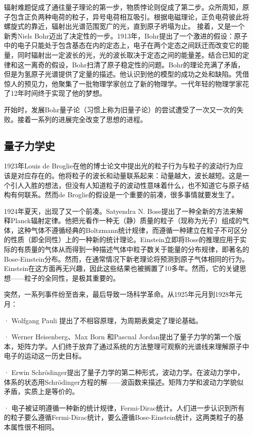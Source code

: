 \documentclass[13pt,a4paper]{article}
\begin{document}
\begin{CJK}{UTF8}{song}
辐射难题促成了通往量子理论的第一步，物质悖论则促成了第二步。众所周知，原子包含正负两种电荷的粒子，异号电荷相互吸引。根据电磁理论，正负电荷彼此将螺旋式的靠近，辐射出光谱范围宽广的光，直到原子坍塌为止。
接着，又是一个新秀Niels Bohr迈出了决定性的一步。1913年，Bohr提出了一个激进的假设：原子中的电子只能处于包含基态在内的定态上，电子在两个定态之间跃迁而改变它的能量，同时辐射出一定波长的光，光的波长取决于定态之间的能量差。结合已知的定律和这一离奇的假设，Bohr扫清了原子稳定性的问题。Bohr的理论充满了矛盾，但是为氢原子光谱提供了定量的描述。他认识到他的模型的成功之处和缺陷。凭借惊人的预见力，他聚集了一批物理学家创立了新的物理学。一代年轻的物理学家花了12年时间终于实现了他的梦想。

开始时，发展Bohr量子论（习惯上称为旧量子论）的尝试遭受了一次又一次的失败。接着一系列的进展完全改变了思想的进程。
 
\subsection{量子力学史}
1923年Louis de Broglie在他的博士论文中提出光的粒子行为与粒子的波动行为应该是对应存在的。他将粒子的波长和动量联系起来：动量越大，波长越短。这是一个引人入胜的想法，但没有人知道粒子的波动性意味着什么，也不知道它与原子结构有何联系。然而de Broglie的假设是一个重要的前凑，很多事情就要发生了。

1924年夏天，出现了又一个前凑。Satyendra N. Bose提出了一种全新的方法来解释Planck辐射定律。他把光看作一种无（静）质量的粒子（现称为光子）组成的气体，这种气体不遵循经典的Boltzmann统计规律，而遵循一种建立在粒子不可区分的性质（即全同性）上的一种新的统计理论。Einstein立即将Bose的推理应用于实际的有质量的气体从而得到一种描述气体中粒子数关于能量的分布规律，即著名的Bose-Einstein分布。然而，在通常情况下新老理论将预测到原子气体相同的行为。Einstein在这方面再无兴趣，因此这些结果也被搁置了10多年。然而，它的关键思想——粒子的全同性，是极其重要的。

突然，一系列事件纷至沓来，最后导致一场科学革命。从1925年元月到1928年元月：

· Wolfgang Pauli 提出了不相容原理，为周期表奠定了理论基础。

· Werner Heisenberg、Max Born 和Pascual Jordan提出了量子力学的第一个版本，矩阵力学。人们终于放弃了通过系统的方法整理可观察的光谱线来理解原子中电子的运动这一历史目标。

· Erwin Schrödinger提出了量子力学的第二种形式，波动力学。在波动力学中，体系的状态用Schrödinger方程的解­——波函数来描述。矩阵力学和波动力学貌似矛盾，实质上是等价的。

· 电子被证明遵循一种新的统计规律，Fermi-Dirac统计。人们进一步认识到所有的粒子要么遵循Fermi-Dirac统计，要么遵循Bose-Einstein统计，这两类粒子的基本属性很不相同。


\end{CJK}
\end{document}
